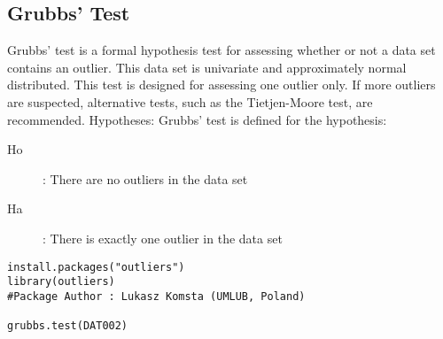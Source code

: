 
\subsection{Grubbs’ Test}
Grubbs' test is a formal hypothesis test for assessing whether or not a  data set contains an outlier.
This data set is univariate and approximately normal distributed. This test is designed for assessing one outlier only.  If more outliers are suspected, alternative tests, such as the Tietjen-Moore test, are recommended.
Hypotheses: Grubbs' test is defined for the hypothesis: 
\begin{description}
\item[Ho] :  There are no outliers in the data set  
\item[Ha] :  There is exactly one outlier in the data set  
\end{description}

\begin{framed}
\begin{verbatim}
install.packages("outliers")
library(outliers)
#Package Author : Lukasz Komsta (UMLUB, Poland)

grubbs.test(DAT002)
\end{verbatim}
\end{framed}
